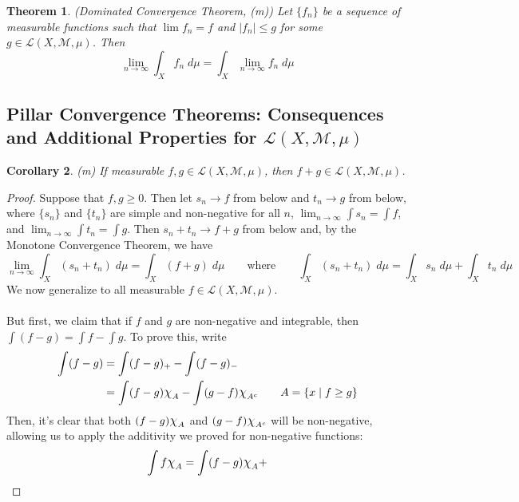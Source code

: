 \documentclass[12pt]{article}
\theoremstyle{plain}
\newtheorem{thm}{Theorem}[subsection]
\newtheorem{cor}[thm]{Corollary}
\theoremstyle{definition}
\theoremstyle{remark}
\newcommand*{\Chi}{\mbox{\large$\chi$}} %
\begin{document}
\begin{thm} \emph{(Dominated Convergence Theorem, (m))}  
Let $\{f_n\}$ be a sequence of measurable functions such that $\lim f_n = f$ and $|f_n|\leq g$ for some $g\in\mathscr{L}(X,\mathscr{M},\mu)$. Then
\[
    \lim_{n\rightarrow\infty} \int_X f_n \; d\mu
    = \int_X \lim_{n\rightarrow\infty}f_n \; d\mu
\]
\end{thm}

\newpage
\subsection{Pillar Convergence Theorems: Consequences and Additional Properties for $\mathscr{L}(X,\mathscr{M},\mu)$}

\begin{cor} 
\label{lebadd}    
\emph{(m)}
If measurable $f,g\in\mathscr{L}(X,\mathscr{M},\mu)$, then $f+g\in\mathscr{L}(X,\mathscr{M},\mu)$.
\end{cor} 
\begin{proof}
    Suppose that $f,g\geq 0$. Then let $s_n{\rightarrow} f$ from below and $t_n{\rightarrow} g$ from below, where $\{s_n\}$ and $\{t_n\}$ are simple and non-negative for all $n$, $\lim_{n\rightarrow\infty}\int s_n = \int f$, and $\lim_{n\rightarrow\infty}\int t_n=\int g$. Then $s_n+t_n\rightarrow f+g$ from below and, by the Monotone Convergence Theorem, we have 
\[
    \lim_{n\rightarrow\infty}   
    \int_X (s_n+t_n)\;d\mu = \int_X (f+g)\;d\mu 
    \qquad \text{where}\qquad
    \int_X (s_n + t_n)\;d\mu
    = \int_X s_n \;d\mu+ \int_X t_n\;d\mu
\]
We now generalize to all measurable $f\in\mathscr{L}(X,\mathscr{M},\mu)$. 
\\
\\
But first, we claim that if $f$ and $g$ are non-negative and integrable, then $\int (f-g) = \int f - \int g$. To prove this, write
\begin{align*}
    \int (f-g) &= \int (f-g)_+ - \int (f-g)_- \\
    &= \int (f-g)\Chi_A - \int (g-f) \Chi_{A^c}
    \qquad A = \{x \;|\; f\geq g\}
\end{align*}
Then, it's clear that both $(f-g)\Chi_A$ and $(g-f)\Chi_{A^c}$ will be non-negative, allowing us to apply the additivity we proved for non-negative functions: 
\[
    \int f\Chi_A = \int (f-g) \Chi_A + 
\]





\end{proof}
\end{document}
